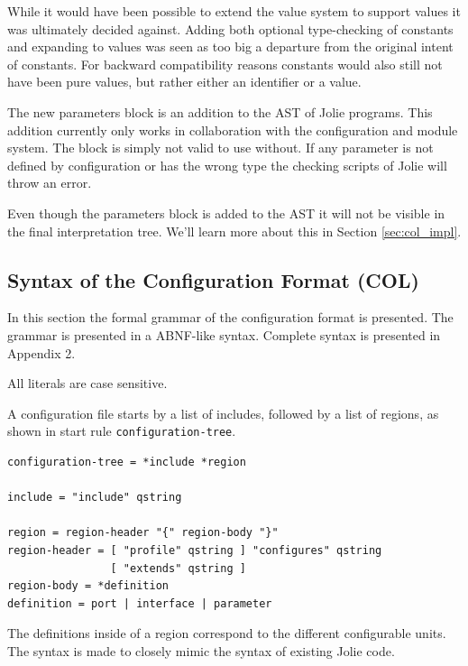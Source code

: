While it would have been possible to extend the value system to support values
it was ultimately decided against. Adding both optional type-checking of
constants and expanding to values was seen as too big a departure from the
original intent of constants. For backward compatibility reasons constants
would also still not have been pure values, but rather either an identifier or
a value.

The new parameters block is an addition to the AST of Jolie programs. This
addition currently only works in collaboration with the configuration and
module system. The block is simply not valid to use without. If any parameter
is not defined by configuration or has the wrong type the checking scripts of
Jolie will throw an error.

Even though the parameters block is added to the AST it will not be visible in
the final interpretation tree. We'll learn more about this in Section
\ref{sec:col_impl}.



\subsection{Syntax of the Configuration Format (COL)}

In this section the formal grammar of the configuration format is presented.
The grammar is presented in a ABNF-like syntax. Complete syntax is presented in
Appendix 2.

All literals are case sensitive.

A configuration file starts by a list of includes, followed by a list of
regions, as shown in start rule \texttt{configuration-tree}.

\begin{verbatim}
configuration-tree = *include *region

include = "include" qstring

region = region-header "{" region-body "}"
region-header = [ "profile" qstring ] "configures" qstring
                [ "extends" qstring ]
region-body = *definition
definition = port | interface | parameter
\end{verbatim}

The definitions inside of a region correspond to the different configurable
units. The syntax is made to closely mimic the syntax of existing Jolie code.

